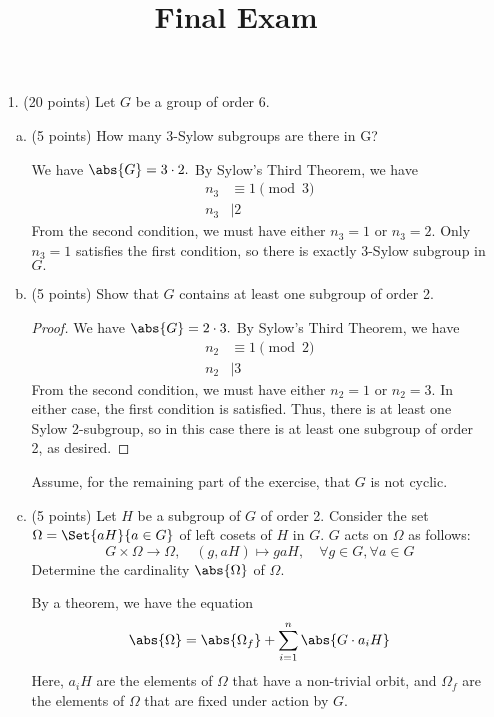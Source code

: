\documentclass{article}
\begin{document}
\title{Final Exam}
\maketitle
\thispagestyle{fancy}

\newpage

\begin{itemize}
	\item[1.] (20 points) Let $G$ be a group of order 6.
		\begin{enumerate}[(a)]
			\item (5 points) How many 3-Sylow subgroups are there in G?
				\begin{soln}
					We have $\abs{G}=3\cdot 2.$ By Sylow's Third Theorem, we have
					\begin{align*}
						n_3 &\equiv 1\pmod 3 \\
						n_3 &\mid 2
					\end{align*}
					From the second condition, we must have either $n_3=1$ or $n_3=2.$ Only $n_3=1$ satisfies the first condition, so there is exactly  3-Sylow subgroup in $G.$	
				\end{soln}

			\item (5 points) Show that $G$ contains at least one subgroup of order 2.
				\begin{proof}
					We have $\abs{G}=2\cdot 3.$ By Sylow's Third Theorem, we have
					\begin{align*}
						n_2 &\equiv 1\pmod 2 \\
						n_2&\mid 3
					\end{align*}
					From the second condition, we must have either $n_2=1$ or $n_2=3.$ In either case, the first condition is satisfied. Thus, there is at least one Sylow 2-subgroup, so in this case there is at least one subgroup of order 2, as desired.
				\end{proof}

				Assume, for the remaining part of the exercise, that $G$ is not cyclic.

			\item (5 points) Let $H$ be a subgroup of $G$ of order 2. Consider the set $\Omega=\Set{aH}{a\in G}$ of left cosets of $H$ in $G.$ $G$ acts on $\Omega$ as follows:
				\[G\times \Omega\to \Omega, \quad (g, aH)\mapsto gaH, \quad \forall g\in G, \forall a\in G\]
				Determine the cardinality $\abs{\Omega}$ of $\Omega.$
				\begin{soln}
					By a theorem, we have the equation
					\[\abs{\Omega} = \abs{\Omega_f}+\sum_{i=1}^{n}\abs{G\cdot a_iH}\]
					Here, $a_iH$ are the elements of $\Omega$ that have a non-trivial orbit, and $\Omega_f$ are the elements of $\Omega$ that are fixed under action by $G.$


\end{soln}
\end{enumerate}
\end{itemize}
\end{document}

